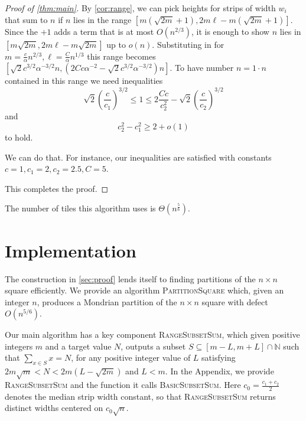 \documentclass[11pt, reqno, psamsfonts]{amsart}
\theoremstyle{plain}
\theoremstyle{definition}
\theoremstyle{remark}
\begin{document}
\begin{proof}[Proof of \cref{thm:main}]
By \cref{cor:range}, we can pick heights for strips of width $w_i$ that sum to $n$ if $n$ lies in the range $[m(\sqrt{2m}+1), 2m\ell - m(\sqrt{2m}+1)]$. Since the $+1$ adds a term that is at most $O(n^{2/3})$, it is enough to show $n$ lies in $[m\sqrt{2m}, 2m\ell - m\sqrt{2m}]$ up to $o(n)$. Substituting in for $m =  \frac{c}{\alpha}n^{2/3}, \ell =  \frac{C}{\alpha}n^{1/3} $ this range becomes $ [\sqrt{2}c^{3/2}\alpha^{-3/2}n, (2Cc\alpha^{-2} - \sqrt{2}c^{3/2}\alpha^{-3/2})n]$. To have number $n = 1 \cdot n$ contained in this range we need inequalities
\[
\sqrt{2}\left(\frac{c}{c_1}\right)^{3/2} 
\leq 
1 
\leq 
2\frac{Cc}{c_2^2} - \sqrt{2}\left(\frac{c}{c_2}\right)^{3/2}
\]
and
\[
c_2^2 - c_1^2 \geq 2 + o(1)
\]
to hold.

We can do that. For instance, our inequalities are satisfied with constants $c = 1, c_1=2, c_2=2.5 ,  C = 5$.

This completes the proof.
\end{proof}
The number of tiles this algorithm uses is $\Theta (n^\frac{5}{6})$. 
\section{Implementation}\label{sec:impl}
The construction in \cref{sec:proof} lends itself to finding partitions of the $n \times n$ square efficiently. We provide an algorithm \textsc{PartitionSquare} which, given an integer $n$, produces a Mondrian partition of the $n \times n$ square with defect $O(n^{5/6})$.

Our main algorithm has a key component \textsc{RangeSubsetSum}, which given positive integers $m$ and a target value $N$, outputs a subset $S \subseteq [m-L, m+L] \cap \mathbb{N}$ such that $\sum_{x \in S}x = N$, for any positive integer value of $L$ satisfying $2m \sqrt m < N < 2m(L - \sqrt{2m})$ and $L < m$. In the Appendix, we provide \textsc{RangeSubsetSum} and the function it calls \textsc{BasicSubsetSum}. Here $c_0 = \frac{c_1+c_2}{2}$ denotes the median strip width constant, so that \textsc{RangeSubsetSum} returns distinct widths centered on $c_0\sqrt{n}$.

\begin{algorithm}
\SetAlgoLined
{}
\DontPrintSemicolon
{}


\caption{\textsc{PartitionSquare}}
\end{algorithm}
\end{document}
